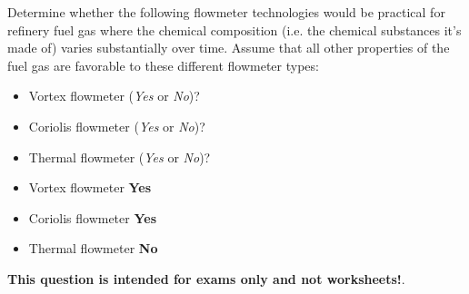 

Determine whether the following flowmeter technologies would be practical for refinery fuel gas where the chemical composition (i.e. the chemical substances it's made of) varies substantially over time.  Assume that all other properties of the fuel gas are favorable to these different flowmeter types:

\begin{itemize}
\item{} Vortex flowmeter ({\it Yes} or {\it No})?
\vskip 10pt
\item{} Coriolis flowmeter ({\it Yes} or {\it No})?
\vskip 10pt
\item{} Thermal flowmeter ({\it Yes} or {\it No})?
\end{itemize}







\begin{itemize}
\item{} Vortex flowmeter {\bf Yes}
\item{} Coriolis flowmeter {\bf Yes}
\item{} Thermal flowmeter {\bf No}
\end{itemize}







{\bf This question is intended for exams only and not worksheets!}.



